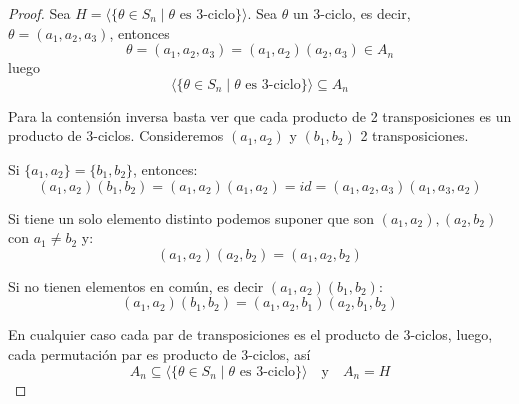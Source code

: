 
\begin{proof}
    Sea $H = \langle \{ \theta \in S_n \mid \theta \text{ es } 3\text{-ciclo} \} \rangle$. Sea $\theta$ un 3-ciclo, es decir, $\theta = (a_1, a_2, a_3)$, entonces
    \begin{equation*}
        \theta = (a_1, a_2, a_3) = (a_1, a_2)(a_2, a_3) \in A_n
    \end{equation*}
    luego
    \begin{equation*}
        \langle \{ \theta \in S_n \mid \theta \text{ es } 3\text{-ciclo} \} \rangle \subseteq A_n
    \end{equation*}

    Para la contensión inversa basta ver que cada producto de 2 transposiciones es un producto de 3-ciclos. Consideremos $(a_1, a_2)$ y $(b_1, b_2)$ 2 transposiciones.
    
    Si $\{a_1, a_2\} = \{b_1, b_2\}$, entonces:
    \begin{equation*}
        (a_1, a_2)(b_1, b_2) = (a_1, a_2)(a_1, a_2) = id = (a_1, a_2, a_3)(a_1, a_3, a_2)
    \end{equation*}
    
    Si tiene un solo elemento distinto podemos suponer que son $(a_1, a_2), (a_2, b_2)$ con $a_1 \neq b_2$ y:
    \begin{equation*}
        (a_1, a_2)(a_2, b_2) = (a_1, a_2, b_2)
    \end{equation*}
    
    Si no tienen elementos en común, es decir $(a_1, a_2)(b_1, b_2)$:
    \begin{equation*}
        (a_1, a_2)(b_1, b_2) = (a_1, a_2, b_1)(a_2, b_1, b_2)
    \end{equation*}
    
    En cualquier caso cada par de transposiciones es el producto de 3-ciclos, luego, cada permutación par es producto de 3-ciclos, así
    \begin{equation*}
        A_n \subseteq \langle \{ \theta \in S_n \mid \theta \text{ es } 3\text{-ciclo} \} \rangle \quad \text{y} \quad A_n = H
    \end{equation*}
\end{proof}


